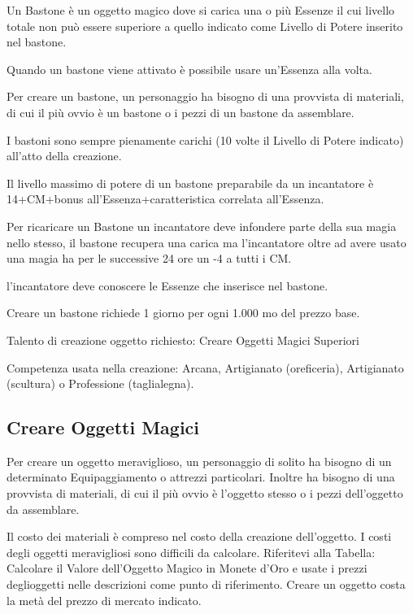 \documentclass[a4paper,11pt,twoside,openany]{book}
\begin{document}
{\bigskip

Un Bastone è un oggetto magico dove si carica una o più Essenze il cui livello totale non può essere superiore a quello indicato come Livello di Potere inserito nel bastone.

Quando un bastone viene attivato è possibile usare un'Essenza alla volta.

Per creare un bastone, un personaggio ha bisogno di una provvista di materiali, di cui il più ovvio è un bastone o i pezzi di un bastone da assemblare.

I bastoni sono sempre pienamente carichi (10 volte il Livello di Potere indicato) all'atto della creazione.

Il livello massimo di potere di un bastone preparabile da un incantatore è 14+CM+bonus all'Essenza+caratteristica correlata all'Essenza. 

Per ricaricare un Bastone un incantatore deve infondere parte della sua magia nello stesso, il bastone recupera una carica ma l'incantatore oltre ad avere usato una magia ha per le successive 24 ore un -4 a tutti i CM.

l'incantatore deve conoscere le Essenze che inserisce nel bastone.

Creare un bastone richiede 1 giorno per ogni 1.000 mo del prezzo base.

Talento di creazione oggetto richiesto: Creare Oggetti Magici Superiori

Competenza usata nella creazione: Arcana, Artigianato (oreficeria), Artigianato (scultura) o Professione (taglialegna).

\pagebreak

\subsection{Creare Oggetti Magici}

Per creare un oggetto meraviglioso, un personaggio di solito ha bisogno di un determinato Equipaggiamento o attrezzi particolari. Inoltre ha bisogno di una provvista di materiali, di cui il più ovvio è l'oggetto stesso o i pezzi dell'oggetto da assemblare. 

Il costo dei materiali è compreso nel costo della creazione dell'oggetto. I costi degli oggetti meravigliosi sono difficili da calcolare. Riferitevi alla Tabella: Calcolare il Valore dell'Oggetto Magico in Monete d'Oro e usate i prezzi deglioggetti nelle descrizioni come punto di riferimento. Creare un oggetto costa la metà del prezzo di mercato indicato.

}
\end{document}
